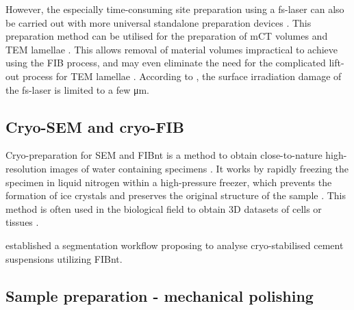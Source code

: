 However, the especially time-consuming site preparation using a \ac{fs-laser} can also be carried out with more universal standalone preparation devices \cite{hoche.2015}.
This preparation method can be utilised for the preparation of \ac{mCT} volumes \cite{krause.2023} and \ac{TEM} lamellae \cite{tkadletz.2024}.
This allows removal of material volumes impractical to achieve using the \ac{FIB} process, and may even eliminate the need for the complicated lift-out process for \ac{TEM} lamellae \cite{tkadletz.2024}.
According to \textcite{hoche.2015}, the surface irradiation damage of the \ac{fs-laser} is limited to a few \unit{\micro\meter}.







\FloatBarrier
\subsection{Cryo-\acs*{SEM} and cryo-\acs*{FIB}}
\label{sec:lit_cryo}

Cryo-preparation for \acs*{SEM} and \acs*{FIBnt} is a method to obtain close-to-nature high-resolution images of water containing specimens \cite{desbois.2008}.
It works by rapidly freezing the specimen in liquid nitrogen within a high-pressure freezer, which prevents the formation of ice crystals and preserves the original structure of the sample \cite{holzer.2007,muller.2021}.
This method is often used in the biological field to obtain 3D datasets of cells or tissues \cite{muller.2021}.

\textcite{holzer.2007} established a segmentation workflow proposing to analyse cryo-stabilised cement suspensions utilizing \ac{FIBnt}. %


\subsection{Sample preparation - mechanical polishing}
\label{sec:lit_sample_preparation}


